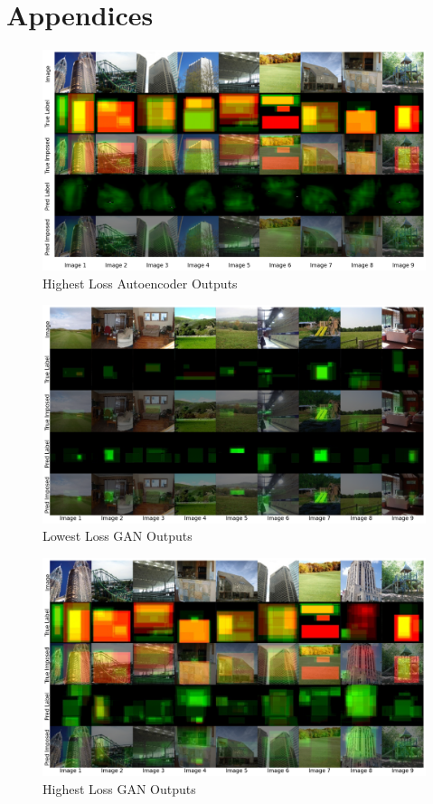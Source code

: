 \documentclass{UoYCSproject}
\begin{document}
\chapter{Appendices}

\begin{figure}[ht]
    \centering
    \includegraphics[width=\linewidth]{Worst autoencoder Outputs}
    \caption{Highest Loss Autoencoder Outputs}
    \label{fig:autoencoderWorstOutput}
\end{figure}

\begin{figure}[ht]
    \centering
    \includegraphics[width=\linewidth]{Best GAN Outputs}
    \caption{Lowest Loss GAN Outputs}
    \label{fig:GANBestOutput}
\end{figure}

\begin{figure}[ht]
    \centering
    \includegraphics[width=\linewidth]{Worst GAN Outputs}
    \caption{Highest Loss GAN Outputs}
    \label{fig:GANWorstOutput}
\end{figure}
\end{document}
